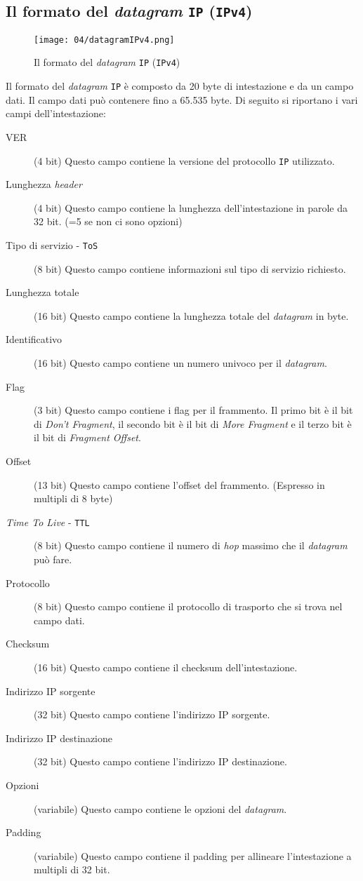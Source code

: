     \subsection{Il formato del \textit{datagram} \texttt{IP} (\texttt{IPv4})}
        \begin{figure}[H]
            \centering
            \texttt{[image: 04/datagramIPv4.png]}
            \caption{Il formato del \textit{datagram} \texttt{IP} (\texttt{IPv4})}
            \label{fig:IPv4Header}
        \end{figure}
        Il formato del \textit{datagram} \texttt{IP} è composto da 20 byte di intestazione e da un campo dati. Il campo dati può contenere fino a 65.535 byte.  Di seguito si riportano i vari campi dell'intestazione:
        \begin{description}
            \item[VER] (4 bit) Questo campo contiene la versione del protocollo \texttt{IP} utilizzato.
            \item[Lunghezza \textit{header}] (4 bit) Questo campo contiene la lunghezza dell'intestazione in parole da 32 bit. (=5 se non ci sono opzioni)
            \item[Tipo di servizio - \texttt{ToS}] (8 bit) Questo campo contiene informazioni sul tipo di servizio richiesto.
            \item[Lunghezza totale] (16 bit) Questo campo contiene la lunghezza totale del \textit{datagram} in byte.
            \item[Identificativo] (16 bit) Questo campo contiene un numero univoco per il \textit{datagram}.
            \item[Flag] (3 bit) Questo campo contiene i flag per il frammento. Il primo bit è il bit di \textit{Don't Fragment}, il secondo bit è il bit di \textit{More Fragment} e il terzo bit è il bit di \textit{Fragment Offset}.
            \item[Offset] (13 bit) Questo campo contiene l'offset del frammento. (Espresso in multipli di 8 byte)
            \item[\textit{Time To Live} - \texttt{TTL}] (8 bit) Questo campo contiene il numero di \textit{hop} massimo che il \textit{datagram} può fare.
            \item[Protocollo] (8 bit) Questo campo contiene il protocollo di trasporto che si trova nel campo dati.
            \item[Checksum] (16 bit) Questo campo contiene il checksum dell'intestazione.
            \item[Indirizzo IP sorgente] (32 bit) Questo campo contiene l'indirizzo IP sorgente.
            \item[Indirizzo IP destinazione] (32 bit) Questo campo contiene l'indirizzo IP destinazione.
            \item[Opzioni] (variabile) Questo campo contiene le opzioni del \textit{datagram}.
            \item[Padding] (variabile) Questo campo contiene il padding per allineare l'intestazione a multipli di 32 bit.
        \end{description}
